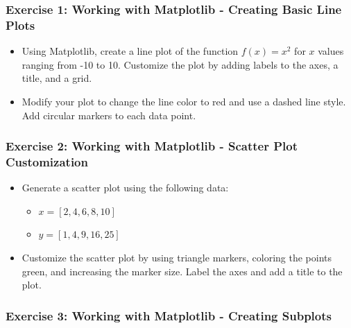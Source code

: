 \documentclass[
  letterpaper,
  DIV=11,
  numbers=noendperiod]{scrreprt}
\providecommand{\tightlist}{%
  \setlength{\itemsep}{0pt}\setlength{\parskip}{0pt}}\usepackage{longtable,booktabs,array}
\begin{document}
\hypertarget{exercise-1-working-with-matplotlib---creating-basic-line-plots}{%
\subsubsection{Exercise 1: Working with Matplotlib - Creating Basic Line
Plots}\label{exercise-1-working-with-matplotlib---creating-basic-line-plots}}

\begin{itemize}
\item
  Using Matplotlib, create a line plot of the function \(f(x) = x^2\)
  for \(x\) values ranging from -10 to 10. Customize the plot by adding
  labels to the axes, a title, and a grid.
\item
  Modify your plot to change the line color to red and use a dashed line
  style. Add circular markers to each data point.
\end{itemize}

\hypertarget{exercise-2-working-with-matplotlib---scatter-plot-customization}{%
\subsubsection{Exercise 2: Working with Matplotlib - Scatter Plot
Customization}\label{exercise-2-working-with-matplotlib---scatter-plot-customization}}

\begin{itemize}
\item
  Generate a scatter plot using the following data:

  \begin{itemize}
  \tightlist
  \item
    \(x = [2, 4, 6, 8, 10]\)
  \item
    \(y = [1, 4, 9, 16, 25]\)
  \end{itemize}
\item
  Customize the scatter plot by using triangle markers, coloring the
  points green, and increasing the marker size. Label the axes and add a
  title to the plot.
\end{itemize}

\hypertarget{exercise-3-working-with-matplotlib---creating-subplots}{%
\subsubsection{Exercise 3: Working with Matplotlib - Creating
Subplots}\label{exercise-3-working-with-matplotlib---creating-subplots}}
\end{document}
